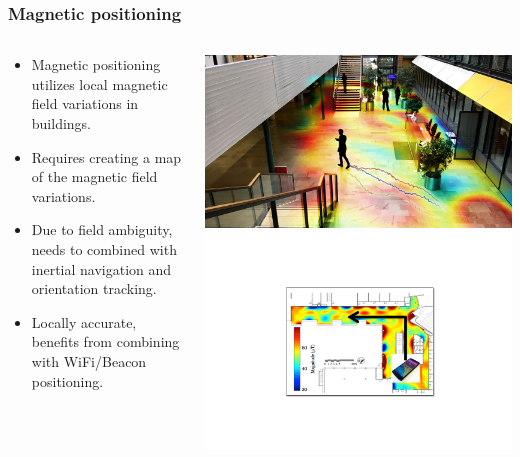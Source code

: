 \documentclass[xcolor=svgnames,english,presentation]{beamer}
\begin{document}
\begin{frame}
  \frametitle{Magnetic positioning}

  \begin{columns}
  \begin{column}{0.6\textwidth}
  \begin{itemize}[<+->]       
  \item \alert{Magnetic positioning} utilizes \alert{local magnetic field variations} in buildings.
  \item Requires creating a \alert{map of the magnetic field variations}.
  \item Due to field ambiguity, needs to combined with \alert{inertial navigation} and \alert{orientation tracking}.
  \item \alert{Locally accurate}, benefits from \alert{combining with WiFi/Beacon positioning}.
  \end{itemize}
  \end{column}
  \begin{column}{0.4\textwidth}
  \includegraphics[width=\columnwidth]{terrain-matching} \\
  \vspace{2em}
  \includegraphics[width=\columnwidth]{magnetic}
  \end{column}
  \end{columns}
\end{frame}
\end{document}
